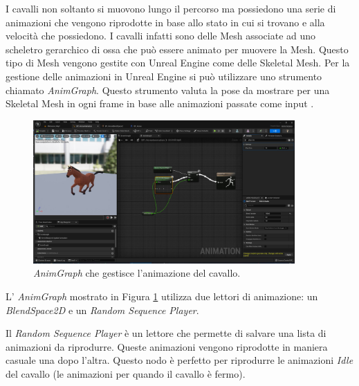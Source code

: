     I cavalli non soltanto si muovono lungo il percorso ma possiedono una serie di animazioni che vengono riprodotte in base allo stato in cui si trovano e alla velocità che possiedono.
    I cavalli infatti sono delle Mesh associate ad uno scheletro gerarchico di ossa che può essere animato per muovere la Mesh.
    Questo tipo di Mesh vengono gestite con Unreal Engine come delle Skeletal Mesh. 
    Per la gestione delle animazioni in Unreal Engine si può utilizzare uno strumento chiamato \textit{AnimGraph}.
    Questo strumento valuta la pose da mostrare per una Skeletal Mesh in ogni frame in base alle animazioni passate come input \cite{UAnimGraph}.

    \begin{figure}[!ht]
        \centering
        \includegraphics[width=10cm]{figure/HorseAnimGraph.JPG}
        \caption{\textit{AnimGraph} che gestisce l'animazione del cavallo.}
        \label{fig:AnimGraph}
    \end{figure}

    L' \textit{AnimGraph} mostrato in Figura \ref{fig:AnimGraph} utilizza due lettori di animazione: un \textit{BlendSpace2D} e un \textit{Random Sequence Player}.
    
    Il \textit{Random Sequence Player} è un lettore che permette di salvare una lista di animazioni da riprodurre.
    Queste animazioni vengono riprodotte in maniera casuale una dopo l'altra.
    Questo nodo è perfetto per riprodurre le animazioni \textit{Idle} del cavallo (le animazioni per quando il cavallo è fermo).

